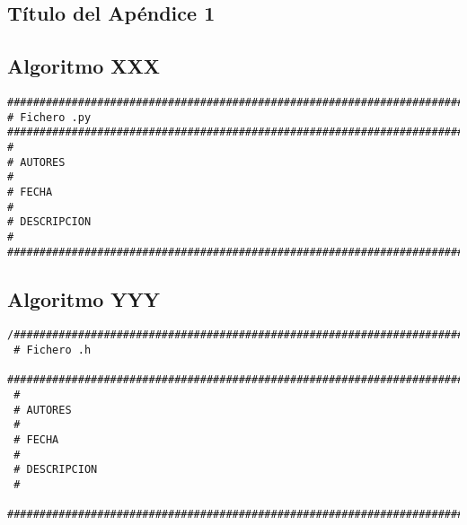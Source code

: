 \documentclass[spanish,a4paper,11pt,twoside]{report}
\begin{document}



\newpage{\pagestyle{empty}\cleardoublepage}
\thispagestyle{empty}
\begin{appendix}

\chapter{Título del Apéndice 1}
\label{appendix:1}
\section{Algoritmo XXX}
\label{Apendice1:XXX}

\begin{center}
\begin{footnotesize}
\begin{verbatim}
###################################################################################
# Fichero .py
###################################################################################
#
# AUTORES
#   
# FECHA
#
# DESCRIPCION
#
###################################################################################
\end{verbatim}
\end{footnotesize}
\end{center}

\section{Algoritmo YYY}
\label{Apendice1:YYY}

\begin{center}
\begin{footnotesize}
\begin{verbatim}
/###################################################################################
 # Fichero .h
 ###################################################################################
 #
 # AUTORES
 #
 # FECHA
 #
 # DESCRIPCION
 #
 ##################################################################################
\end{verbatim}
\end{footnotesize}
\end{center}

%


\end{appendix}
\end{document}
